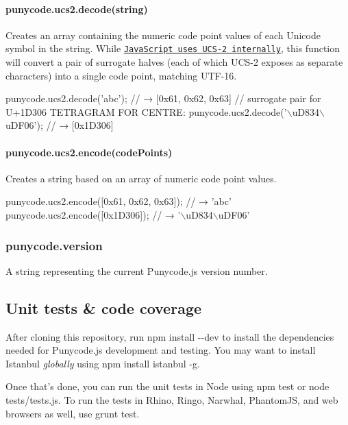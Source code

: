\paragraph*{{\ttfamily punycode.\+ucs2.\+decode(string)}}

Creates an array containing the numeric code point values of each Unicode symbol in the string. While \href{https://mathiasbynens.be/notes/javascript-encoding}{\tt Java\+Script uses U\+C\+S-\/2 internally}, this function will convert a pair of surrogate halves (each of which U\+C\+S-\/2 exposes as separate characters) into a single code point, matching U\+T\+F-\/16.


\begin{DoxyCode}
punycode.ucs2.decode('abc');
// → [0x61, 0x62, 0x63]
// surrogate pair for U+1D306 TETRAGRAM FOR CENTRE:
punycode.ucs2.decode('\(\backslash\)uD834\(\backslash\)uDF06');
// → [0x1D306]
\end{DoxyCode}


\paragraph*{{\ttfamily punycode.\+ucs2.\+encode(code\+Points)}}

Creates a string based on an array of numeric code point values.


\begin{DoxyCode}
punycode.ucs2.encode([0x61, 0x62, 0x63]);
// → 'abc'
punycode.ucs2.encode([0x1D306]);
// → '\(\backslash\)uD834\(\backslash\)uDF06'
\end{DoxyCode}


\subsubsection*{{\ttfamily punycode.\+version}}

A string representing the current Punycode.\+js version number.

\subsection*{Unit tests \& code coverage}

After cloning this repository, run {\ttfamily npm install -\/-\/dev} to install the dependencies needed for Punycode.\+js development and testing. You may want to install Istanbul {\itshape globally} using {\ttfamily npm install istanbul -\/g}.

Once that’s done, you can run the unit tests in Node using {\ttfamily npm test} or {\ttfamily node tests/tests.\+js}. To run the tests in Rhino, Ringo, Narwhal, Phantom\+JS, and web browsers as well, use {\ttfamily grunt test}.

